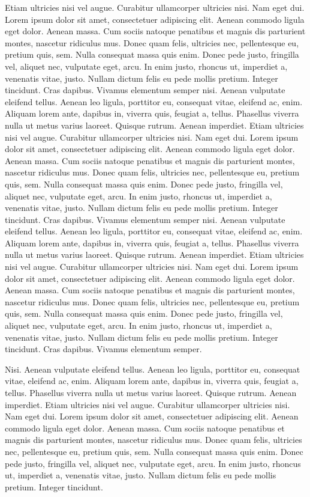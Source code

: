 \documentclass[
    12pt,
    letterpaper,
    oneside,
    noraggedright
]{turabian-researchpaper}
\begin{document}
Etiam ultricies nisi vel augue. Curabitur ullamcorper ultricies nisi.
Nam eget dui. Lorem ipsum dolor sit amet, consectetuer adipiscing elit.
Aenean commodo ligula eget dolor. Aenean massa. Cum sociis natoque
penatibus et magnis dis parturient montes, nascetur ridiculus mus. Donec
quam felis, ultricies nec, pellentesque eu, pretium quis, sem. Nulla
consequat massa quis enim. Donec pede justo, fringilla vel, aliquet nec,
vulputate eget, arcu. In enim justo, rhoncus ut, imperdiet a, venenatis
vitae, justo. Nullam dictum felis eu pede mollis pretium. Integer
tincidunt. Cras dapibus. Vivamus elementum semper nisi. Aenean vulputate
eleifend tellus. Aenean leo ligula, porttitor eu, consequat vitae,
eleifend ac, enim. Aliquam lorem ante, dapibus in, viverra quis, feugiat
a, tellus. Phasellus viverra nulla ut metus varius laoreet. Quisque
rutrum. Aenean imperdiet. Etiam ultricies nisi vel augue. Curabitur
ullamcorper ultricies nisi. Nam eget dui. Lorem ipsum dolor sit amet,
consectetuer adipiscing elit. Aenean commodo ligula eget dolor. Aenean
massa. Cum sociis natoque penatibus et magnis dis parturient montes,
nascetur ridiculus mus. Donec quam felis, ultricies nec, pellentesque
eu, pretium quis, sem. Nulla consequat massa quis enim. Donec pede
justo, fringilla vel, aliquet nec, vulputate eget, arcu. In enim justo,
rhoncus ut, imperdiet a, venenatis vitae, justo. Nullam dictum felis eu
pede mollis pretium. Integer tincidunt. Cras dapibus. Vivamus elementum
semper nisi. Aenean vulputate eleifend tellus. Aenean leo ligula,
porttitor eu, consequat vitae, eleifend ac, enim. Aliquam lorem ante,
dapibus in, viverra quis, feugiat a, tellus. Phasellus viverra nulla ut
metus varius laoreet. Quisque rutrum. Aenean imperdiet. Etiam ultricies
nisi vel augue. Curabitur ullamcorper ultricies nisi. Nam eget dui.
Lorem ipsum dolor sit amet, consectetuer adipiscing elit. Aenean commodo
ligula eget dolor. Aenean massa. Cum sociis natoque penatibus et magnis
dis parturient montes, nascetur ridiculus mus. Donec quam felis,
ultricies nec, pellentesque eu, pretium quis, sem. Nulla consequat massa
quis enim. Donec pede justo, fringilla vel, aliquet nec, vulputate eget,
arcu. In enim justo, rhoncus ut, imperdiet a, venenatis vitae, justo.
Nullam dictum felis eu pede mollis pretium. Integer tincidunt. Cras
dapibus. Vivamus elementum semper.

Nisi. Aenean vulputate eleifend tellus. Aenean leo ligula, porttitor eu,
consequat vitae, eleifend ac, enim. Aliquam lorem ante, dapibus in,
viverra quis, feugiat a, tellus. Phasellus viverra nulla ut metus varius
laoreet. Quisque rutrum. Aenean imperdiet. Etiam ultricies nisi vel
augue. Curabitur ullamcorper ultricies nisi. Nam eget dui. Lorem ipsum
dolor sit amet, consectetuer adipiscing elit. Aenean commodo ligula eget
dolor. Aenean massa. Cum sociis natoque penatibus et magnis dis
parturient montes, nascetur ridiculus mus. Donec quam felis, ultricies
nec, pellentesque eu, pretium quis, sem. Nulla consequat massa quis
enim. Donec pede justo, fringilla vel, aliquet nec, vulputate eget,
arcu. In enim justo, rhoncus ut, imperdiet a, venenatis vitae, justo.
Nullam dictum felis eu pede mollis pretium. Integer tincidunt.
\end{document}

